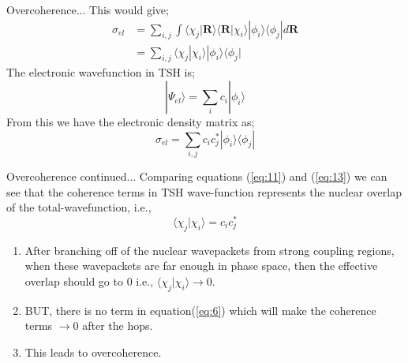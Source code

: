 \documentclass{beamer}
\begin{document}
	\begin{frame}[t]{Overcoherence...}
	This would give;
	\begin{equation}\label{eq:11}
	\begin{split}
	\sigma_{el} &= \sum_{i,j} \displaystyle\int \langle\chi_j|\textbf{R}\rangle\langle\textbf{R}|\chi_i\rangle|\phi_i\rangle\langle\phi_j| d\textbf{R}\\
	&= \sum_{i,j} \langle\chi_j|\chi_i\rangle|\phi_i\rangle\langle\phi_j|
	\end{split}
	\end{equation}
	The electronic wavefunction in TSH is;
	\begin{equation}\label{eq:12}
	|\Psi_{el}\rangle = \sum_i c_i|\phi_i\rangle
	\end{equation}
	From this we have the electronic density matrix as;
	\begin{equation}\label{eq:13}
	\sigma_{el} = \sum_{i,j} c_ic_j^*|\phi_i\rangle\langle\phi_j|
	\end{equation}
    \end{frame}	
    
    \begin{frame}[t]{Overcoherence continued...}
    Comparing equations (\ref{eq:11}) and (\ref{eq:13}) we can see that the coherence terms in TSH wave-function  represents the nuclear overlap of the total-wavefunction, i.e.,
    \begin{equation}\label{eq:14}
    \langle\chi_j|\chi_i\rangle = c_ic_j^*
    \end{equation} 
    \begin{enumerate}
    \item{After branching off of the nuclear wavepackets from strong coupling regions, when these wavepackets are far enough in phase space, then the effective overlap should go to 0 i.e., $\langle\chi_j|\chi_i\rangle \rightarrow 0$.}
    \item{BUT, there is no term in equation(\ref{eq:6}) which will make the coherence terms $\rightarrow 0$ after the hops.}
    \item{This leads to overcoherence.}
	\end{enumerate}        
    \end{frame}    	
	
\end{document}
